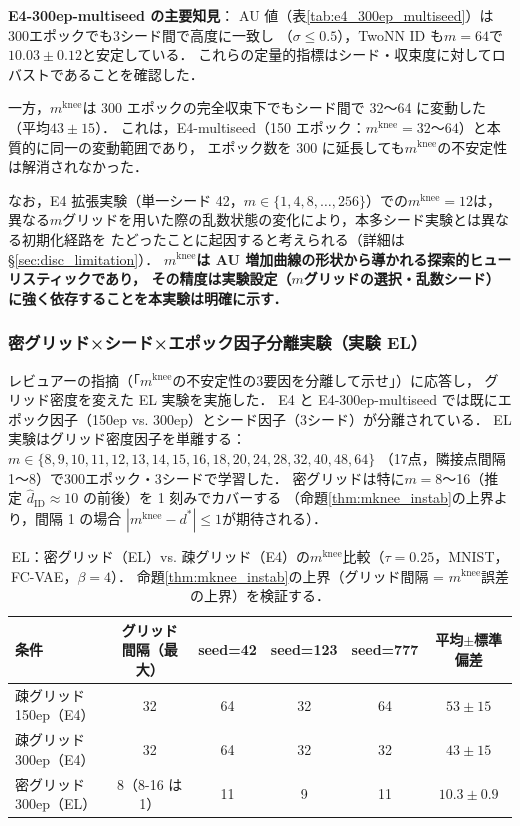 \documentclass[11pt,a4paper]{jsarticle}
\newcommand{\mknee}{m^{\mathrm{knee}}}
\begin{document}
\textbf{E4-300ep-multiseed の主要知見}：
AU 値（表\ref{tab:e4_300ep_multiseed}）は300エポックでも3シード間で高度に一致し
（$\sigma \leq 0.5$），TwoNN ID も$m = 64$で$10.03 \pm 0.12$と安定している．
これらの定量的指標はシード・収束度に対してロバストであることを確認した．

一方，$\mknee$は 300 エポックの完全収束下でもシード間で 32〜64 に変動した
（平均$43 \pm 15$）．
これは，E4-multiseed（150 エポック：$\mknee = 32$〜$64$）と本質的に同一の変動範囲であり，
エポック数を 300 に延長しても$\mknee$の不安定性は解消されなかった．

なお，E4 拡張実験（単一シード 42，$m \in \{1, 4, 8, \ldots, 256\}$）での$\mknee = 12$は，
異なる$m$グリッドを用いた際の乱数状態の変化により，本多シード実験とは異なる初期化経路を
たどったことに起因すると考えられる（詳細は§\ref{sec:disc_limitation}）．
\textbf{$\mknee$は AU 増加曲線の形状から導かれる探索的ヒューリスティックであり，
その精度は実験設定（$m$グリッドの選択・乱数シード）に強く依存することを本実験は明確に示す．}

\subsubsection{密グリッド×シード×エポック因子分離実験（実験 EL）}\label{sec:exp_el}

レビュアーの指摘（「$\mknee$の不安定性の3要因を分離して示せ」）に応答し，
グリッド密度を変えた EL 実験を実施した．
E4 と E4-300ep-multiseed では既にエポック因子（150ep vs. 300ep）とシード因子（3シード）が分離されている．
EL 実験はグリッド密度因子を単離する：$m \in \{8,9,10,11,12,13,14,15,16,18,20,24,28,32,40,48,64\}$
（17点，隣接点間隔 1〜8）で300エポック・3シードで学習した．
密グリッドは特に$m = 8$〜16（推定 $\hat{d}_\mathrm{ID} \approx 10$ の前後）を 1 刻みでカバーする
（命題\ref{thm:mknee_instab}の上界より，間隔 1 の場合 $|\mknee - d^*| \leq 1$が期待される）．

\begin{table}[H]
\centering
\caption{EL：密グリッド（EL）vs. 疎グリッド（E4）の$\mknee$比較（$\tau=0.25$，MNIST，FC-VAE，$\beta=4$）．
命題\ref{thm:mknee_instab}の上界（グリッド間隔 = $\mknee$誤差の上界）を検証する．}
\label{tab:el_mknee}
\small
\begin{tabular}{lccccc}
\toprule
条件 & グリッド間隔（最大） & seed=42 & seed=123 & seed=777 & 平均$\pm$標準偏差 \\
\midrule
疎グリッド 150ep（E4） & 32 & 64 & 32 & 64 & $53 \pm 15$ \\
疎グリッド 300ep（E4） & 32 & 64 & 32 & 32 & $43 \pm 15$ \\
密グリッド 300ep（EL） & 8（8-16 は 1） & 11 & 9 & 11 & $10.3 \pm 0.9$ \\
\bottomrule
\end{tabular}
\end{table}
\end{document}
